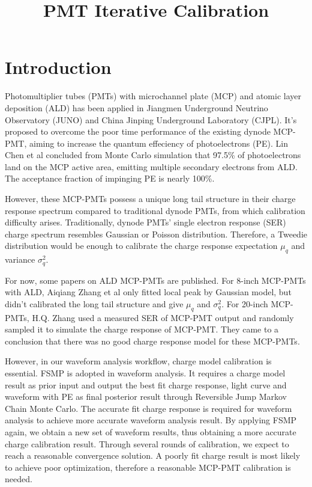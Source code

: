
\begin{survey}
\label{cha:survey}

\title{PMT Iterative Calibration}
\maketitle


\tableofcontents

\section{Introduction}

Photomultiplier tubes (PMTs) with microchannel plate (MCP) and atomic layer deposition (ALD) has been applied in 
Jiangmen Underground Neutrino Observatory (JUNO) and China Jinping Underground Laboratory (CJPL)\cite{Chen2023Nov}.
It's proposed to overcome the poor time performance of the existing dynode MCP-PMT, 
aiming to increase the quantum effeciency of photoelectrons (PE). Lin Chen et al concluded from Monte Carlo simulation 
that 97.5\% of photoelectrons land on the MCP active area, emitting multiple secondary electrons from ALD.
The acceptance fraction of impinging PE is nearly 100\%\cite{Chen2023Nov}.

However, these MCP-PMTs possess a unique long tail structure in their charge response spectrum
compared to traditional dynode PMTs, from which calibration difficulty arises\cite{Zhang2023Oct}.
Traditionally, dynode PMTs' single electron response (SER) charge spectrum resembles Gaussian or Poisson distribution.
Therefore, a Tweedie distribution would be enough to calibrate the charge response expectation $\mu_q$ and variance $\sigma_q^2$.

For now, some papers on ALD MCP-PMTs are published.
For 8-inch MCP-PMTs with ALD, Aiqiang Zhang et al only fitted local peak by Gaussian model,
but didn't calibrated the long tail structure and give $\mu_q$ and $\sigma_q^2$\cite{Zhang2023Oct}.
For 20-inch MCP-PMTs, H.Q. Zhang used a measured SER of MCP-PMT output and randomly sampled it to simulate the charge response of MCP-PMT.
They came to a conclusion that there was no good charge response model for these MCP-PMTs\cite{Zhang_2021}.

However, in our waveform analysis workflow, charge model calibration is essential.
FSMP is adopted in waveform analysis. It requires a charge model result as prior input
and output the best fit charge response, light curve and waveform with PE as final posterior result through Reversible Jump Markov Chain Monte Carlo\cite{Xu_2022}.
The accurate fit charge response is required for waveform analysis to achieve more accurate waveform analysis result.
By applying FSMP again, we obtain a new set of waveform results, thus obtaining a more accurate charge calibration result.
Through several rounds of calibration, we expect to reach a reasonable convergence solution.
A poorly fit charge result is most likely to achieve poor optimization,
therefore a reasonable MCP-PMT calibration is needed.


\end{survey}
